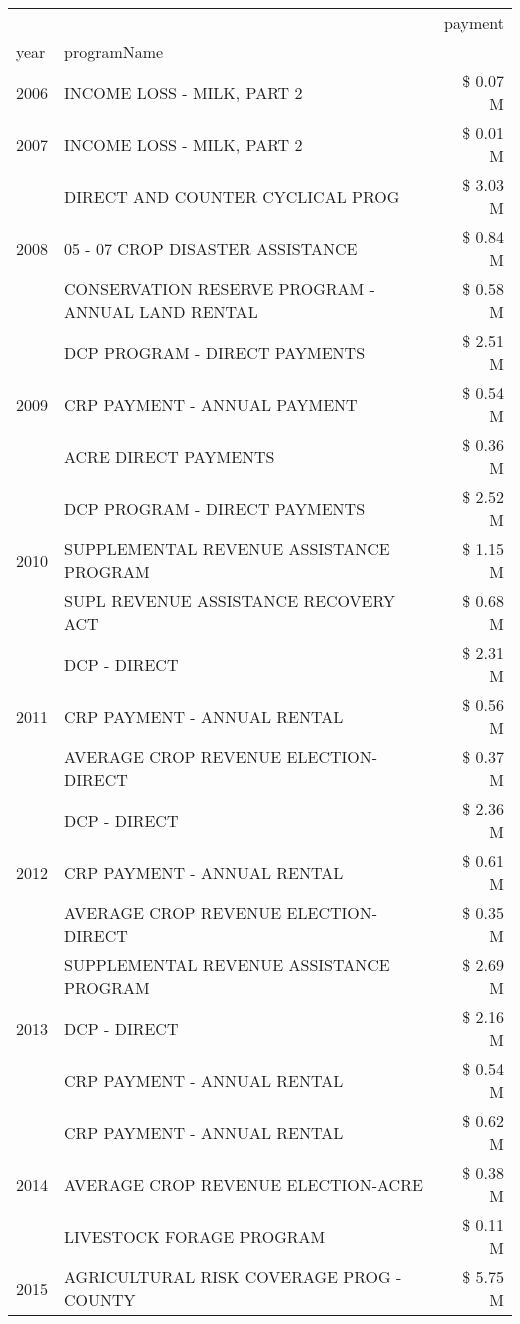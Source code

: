 \begin{tabular}{llr}
\toprule
 &  & payment \\
year & programName &  \\
\midrule
2006 & INCOME LOSS - MILK, PART 2 & \$ 0.07 M \\
\cline{1-3}
2007 & INCOME LOSS - MILK, PART 2 & \$ 0.01 M \\
\cline{1-3}
\multirow[t]{3}{*}{2008} & DIRECT AND COUNTER CYCLICAL PROG & \$ 3.03 M \\
 & 05 - 07 CROP DISASTER ASSISTANCE & \$ 0.84 M \\
 & CONSERVATION RESERVE PROGRAM - ANNUAL LAND RENTAL & \$ 0.58 M \\
\cline{1-3}
\multirow[t]{3}{*}{2009} & DCP PROGRAM - DIRECT PAYMENTS & \$ 2.51 M \\
 & CRP PAYMENT - ANNUAL PAYMENT & \$ 0.54 M \\
 & ACRE DIRECT PAYMENTS & \$ 0.36 M \\
\cline{1-3}
\multirow[t]{3}{*}{2010} & DCP PROGRAM - DIRECT PAYMENTS & \$ 2.52 M \\
 & SUPPLEMENTAL REVENUE ASSISTANCE PROGRAM & \$ 1.15 M \\
 & SUPL REVENUE ASSISTANCE RECOVERY ACT & \$ 0.68 M \\
\cline{1-3}
\multirow[t]{3}{*}{2011} & DCP - DIRECT & \$ 2.31 M \\
 & CRP PAYMENT - ANNUAL RENTAL & \$ 0.56 M \\
 & AVERAGE CROP REVENUE ELECTION-DIRECT & \$ 0.37 M \\
\cline{1-3}
\multirow[t]{3}{*}{2012} & DCP - DIRECT & \$ 2.36 M \\
 & CRP PAYMENT - ANNUAL RENTAL & \$ 0.61 M \\
 & AVERAGE CROP REVENUE ELECTION-DIRECT & \$ 0.35 M \\
\cline{1-3}
\multirow[t]{3}{*}{2013} & SUPPLEMENTAL REVENUE ASSISTANCE PROGRAM & \$ 2.69 M \\
 & DCP - DIRECT & \$ 2.16 M \\
 & CRP PAYMENT - ANNUAL RENTAL & \$ 0.54 M \\
\cline{1-3}
\multirow[t]{3}{*}{2014} & CRP PAYMENT - ANNUAL RENTAL & \$ 0.62 M \\
 & AVERAGE CROP REVENUE ELECTION-ACRE & \$ 0.38 M \\
 & LIVESTOCK FORAGE PROGRAM & \$ 0.11 M \\
\cline{1-3}
\multirow[t]{3}{*}{2015} & AGRICULTURAL RISK COVERAGE PROG - COUNTY & \$ 5.75 M \\

\end{tabular}
